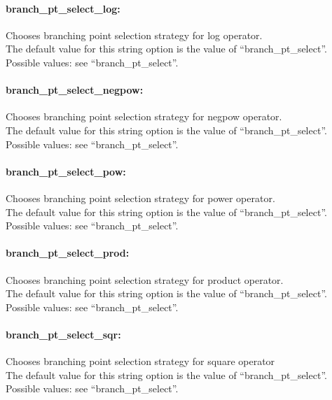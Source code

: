 \paragraph{branch\_pt\_select\_log:}\label{sec:branch_pt_select_log} Chooses branching point selection strategy for log operator. $\;$ \\
The default value for this string option is the value of ``branch\_pt\_select''. \\
Possible values: see ``branch\_pt\_select''.

\paragraph{branch\_pt\_select\_negpow:}\label{sec:branch_pt_select_negpow} Chooses branching point selection strategy for negpow operator. $\;$ \\
The default value for this string option is the value of ``branch\_pt\_select''. \\
Possible values: see ``branch\_pt\_select''.

\paragraph{branch\_pt\_select\_pow:}\label{sec:branch_pt_select_pow} Chooses branching point selection strategy for power operator. $\;$ \\
The default value for this string option is the value of ``branch\_pt\_select''. \\
Possible values: see ``branch\_pt\_select''.

\paragraph{branch\_pt\_select\_prod:}\label{sec:branch_pt_select_prod} Chooses branching point selection strategy for product operator. $\;$ \\
The default value for this string option is the value of ``branch\_pt\_select''. \\
Possible values: see ``branch\_pt\_select''.

\paragraph{branch\_pt\_select\_sqr:}\label{sec:branch_pt_select_sqr} Chooses branching point selection strategy for square operator$\;$ \\
The default value for this string option is the value of ``branch\_pt\_select''. \\
Possible values: see ``branch\_pt\_select''.

